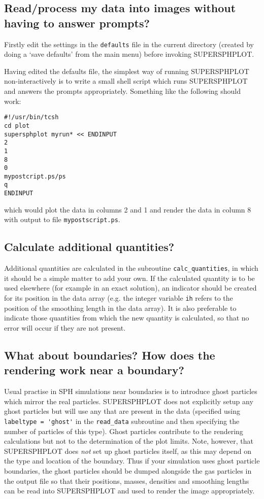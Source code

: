 \documentclass[a4paper,12pt]{article}
\begin{document}
\subsection{Read/process my data into images without having to answer prompts?}
 Firstly edit the settings in the \verb+defaults+ file in the current
directory (created by doing a `save defaults' from the main menu) before invoking SUPERSPHPLOT.

 Having edited the defaults file, the simplest way of running SUPERSPHPLOT
non-interactively is to write a small shell script which runs SUPERSPHPLOT
and answers the prompts appropriately. Something like the following should work:
\begin{verbatim}
#!/usr/bin/tcsh
cd plot
supersphplot myrun* << ENDINPUT
2
1
8
0
mypostcript.ps/ps
q
ENDINPUT
\end{verbatim}
which would plot the data in columns 2 and 1 and render the data in column 8 with
output to file \verb+mypostscript.ps+.

\subsection{Calculate additional quantities?}
 Additional quantities are calculated in the subroutine \verb+calc_quantities+,
in which it should be a simple matter to add your own.
If the calculated quantity is to be used elsewhere (for example in an exact
solution), an indicator should be created for its position in the data array
(e.g. the integer variable \verb+ih+ refers to the position of the smoothing
length in the data array). It is also preferable to indicate those quantities
from which the new quantity is calculated, so that no error will occur if they
are not present.

\subsection{What about boundaries? How does the rendering work near a boundary?}
 Usual practise in SPH simulations near boundaries is
to introduce ghost particles which mirror the real particles. SUPERSPHPLOT does not
explicitly setup any ghost particles but will use any that are present in the data
(specified using \verb+labeltype = 'ghost'+ in the \verb+read_data+ subroutine and
then specifying the number of particles of this type). Ghost particles contribute
to the rendering calculations but not to the determination of the plot limits. Note,
however, that SUPERSPHPLOT does \emph{not} set up ghost particles itself, as this may depend
on the type and location of the boundary. Thus if your simulation uses ghost particle
boundaries, the ghost particles should be dumped alongside the gas particles in the
output file so that their positions, masses, densities and smoothing lengths can be
read into SUPERSPHPLOT and used to render the image appropriately.
\end{document}
